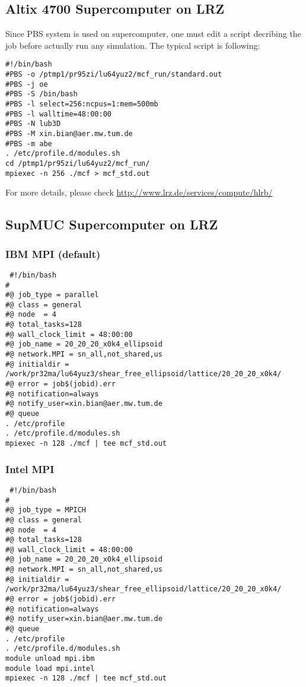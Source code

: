 \documentclass[a4paper,10pt]{article}
\begin{document}
\subsection{Altix 4700 Supercomputer on LRZ}
Since PBS system is used on supercomputer,
one must edit a script decribing the job
before actually run any simulation.
The typical script is following:
\begin{verbatim}
#!/bin/bash 
#PBS -o /ptmp1/pr95zi/lu64yuz2/mcf_run/standard.out
#PBS -j oe 
#PBS -S /bin/bash 
#PBS -l select=256:ncpus=1:mem=500mb
#PBS -l walltime=48:00:00 
#PBS -N lub3D
#PBS -M xin.bian@aer.mw.tum.de 
#PBS -m abe 
. /etc/profile.d/modules.sh 
cd /ptmp1/pr95zi/lu64yuz2/mcf_run/
mpiexec -n 256 ./mcf > mcf_std.out
\end{verbatim}
For more details,
please
check
\url{http://www.lrz.de/services/compute/hlrb/}
\subsection{SupMUC Supercomputer on LRZ}

\subsubsection{IBM MPI (default)}
\begin{verbatim}
 #!/bin/bash
#
#@ job_type = parallel
#@ class = general
#@ node  = 4
#@ total_tasks=128
#@ wall_clock_limit = 48:00:00
#@ job_name = 20_20_20_x0k4_ellipsoid
#@ network.MPI = sn_all,not_shared,us
#@ initialdir = /work/pr32ma/lu64yuz3/shear_free_ellipsoid/lattice/20_20_20_x0k4/
#@ error = job$(jobid).err
#@ notification=always
#@ notify_user=xin.bian@aer.mw.tum.de
#@ queue
. /etc/profile
. /etc/profile.d/modules.sh
mpiexec -n 128 ./mcf | tee mcf_std.out
\end{verbatim}

\subsubsection{Intel MPI }
\begin{verbatim}
 #!/bin/bash
#
#@ job_type = MPICH
#@ class = general
#@ node  = 4
#@ total_tasks=128
#@ wall_clock_limit = 48:00:00
#@ job_name = 20_20_20_x0k4_ellipsoid
#@ network.MPI = sn_all,not_shared,us
#@ initialdir = /work/pr32ma/lu64yuz3/shear_free_ellipsoid/lattice/20_20_20_x0k4/
#@ error = job$(jobid).err
#@ notification=always
#@ notify_user=xin.bian@aer.mw.tum.de
#@ queue
. /etc/profile
. /etc/profile.d/modules.sh
module unload mpi.ibm
module load mpi.intel
mpiexec -n 128 ./mcf | tee mcf_std.out
\end{verbatim}
\end{document}

